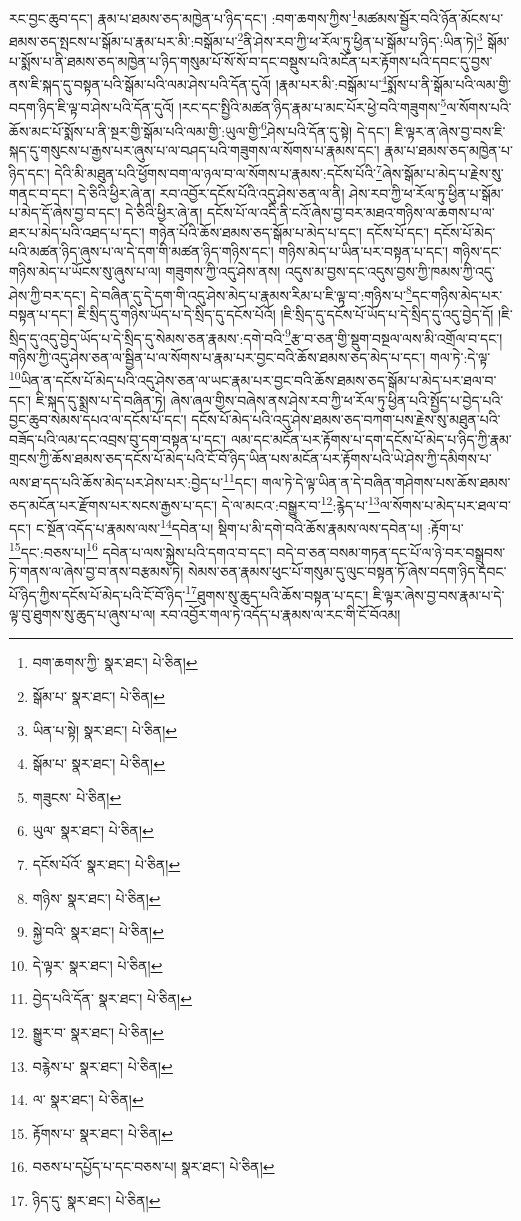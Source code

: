 རང་བྱང་ཆུབ་དང་། རྣམ་པ་ཐམས་ཅད་མཁྱེན་པ་ཉིད་དང་། :བག་ཆགས་ཀྱིས་\footnote{བག་ཆགས་ཀྱི་  སྣར་ཐང་།  པེ་ཅིན། }མཚམས་སྦྱོར་བའི་ཉོན་མོངས་པ་ཐམས་ཅད་སྤངས་པ་སྒོམ་པ་རྣམ་པར་མི་:བསྒོམ་པ་\footnote{སྒོམ་པ་  སྣར་ཐང་།  པེ་ཅིན། }ནི་ཤེས་རབ་ཀྱི་ཕ་རོལ་ཏུ་ཕྱིན་པ་སྒོམ་པ་ཉིད་:ཡིན་ཏེ།\footnote{ཡིན་པ་སྟེ།  སྣར་ཐང་།  པེ་ཅིན། } སྒོམ་པ་སྨོས་པ་ནི་ཐམས་ཅད་མཁྱེན་པ་ཉིད་གསུམ་པོ་སོ་སོ་བ་དང་བསྡུས་པའི་མངོན་པར་རྟོགས་པའི་དབང་དུ་བྱས་ནས་ཇི་སྐད་དུ་བསྟན་པའི་སྒོམ་པའི་ལམ་ཤེས་པའི་དོན་དུའོ། །རྣམ་པར་མི་:བསྒོམ་པ་\footnote{སྒོམ་པ་  སྣར་ཐང་།  པེ་ཅིན། }སྨོས་པ་ནི་སྒོམ་པའི་ལམ་གྱི་བདག་ཉིད་ཇི་ལྟ་བ་ཤེས་པའི་དོན་དུའོ། །རང་དང་སྤྱིའི་མཚན་ཉིད་རྣམ་པ་མང་པོར་ཕྱེ་བའི་གཟུགས་\footnote{གཟུངས་  པེ་ཅིན། }ལ་སོགས་པའི་ཆོས་མང་པོ་སྨོས་པ་ནི་སྔར་གྱི་སྒོམ་པའི་ལམ་གྱི་:ཡུལ་གྱི་\footnote{ཡུལ་  སྣར་ཐང་།  པེ་ཅིན། }ཤེས་པའི་དོན་དུ་སྟེ། དེ་དང་། ཇི་ལྟར་ན་ཞེས་བྱ་བས་ཇི་སྐད་དུ་གསུངས་པ་རྒྱས་པར་ཞུས་པ་ལ་བཤད་པའི་གཟུགས་ལ་སོགས་པ་རྣམས་དང་། རྣམ་པ་ཐམས་ཅད་མཁྱེན་པ་ཉིད་དང་། དེའི་མི་མཐུན་པའི་ཕྱོགས་བག་ལ་ཉལ་བ་ལ་སོགས་པ་རྣམས་:དངོས་པོའི་\footnote{དངོས་པོའོ་  སྣར་ཐང་།  པེ་ཅིན། }ཞེས་སྒོམ་པ་མེད་པ་རྗེས་སུ་གནང་བ་དང་། དེ་ཅིའི་ཕྱིར་ཞེ་ན། རབ་འབྱོར་དངོས་པོའི་འདུ་ཤེས་ཅན་ལ་ནི། ཤེས་རབ་ཀྱི་ཕ་རོལ་ཏུ་ཕྱིན་པ་སྒོམ་པ་མེད་དོ་ཞེས་བྱ་བ་དང་། དེ་ཅིའི་ཕྱིར་ཞེ་ན། དངོས་པོ་ལ་འདི་ནི་ངའོ་ཞེས་བྱ་བར་མཐའ་གཉིས་ལ་ཆགས་པ་ལ་ཐར་པ་མེད་པའི་འཐད་པ་དང་། གཉེན་པོའི་ཆོས་ཐམས་ཅད་སྒོམ་པ་མེད་པ་དང་། དངོས་པོ་དང་། དངོས་པོ་མེད་པའི་མཚན་ཉིད་ཞུས་པ་ལ་དེ་དག་གི་མཚན་ཉིད་གཉིས་དང་། གཉིས་མེད་པ་ཡིན་པར་བསྟན་པ་དང་། གཉིས་དང་གཉིས་མེད་པ་ཡོངས་སུ་ཞུས་པ་ལ། གཟུགས་ཀྱི་འདུ་ཤེས་ནས། འདུས་མ་བྱས་དང་འདུས་བྱས་ཀྱི་ཁམས་ཀྱི་འདུ་ཤེས་ཀྱི་བར་དང་། དེ་བཞིན་དུ་དེ་དག་གི་འདུ་ཤེས་མེད་པ་རྣམས་རིམ་པ་ཇི་ལྟ་བ་:གཉིས་པ་\footnote{གཉིས་  སྣར་ཐང་།  པེ་ཅིན། }དང་གཉིས་མེད་པར་བསྟན་པ་དང་། ཇི་སྲིད་དུ་གཉིས་ཡོད་པ་དེ་སྲིད་དུ་དངོས་པོའོ། །ཇི་སྲིད་དུ་དངོས་པོ་ཡོད་པ་དེ་སྲིད་དུ་འདུ་བྱེད་དོ། །ཇི་སྲིད་དུ་འདུ་བྱེད་ཡོད་པ་དེ་སྲིད་དུ་སེམས་ཅན་རྣམས་:དགེ་བའི་\footnote{སྐྱེ་བའི་  སྣར་ཐང་།  པེ་ཅིན། }རྩ་བ་ཅན་གྱི་སྡུག་བསྔལ་ལས་མི་འགྲོལ་བ་དང་། གཉིས་ཀྱི་འདུ་ཤེས་ཅན་ལ་སྦྱིན་པ་ལ་སོགས་པ་རྣམ་པར་བྱང་བའི་ཆོས་ཐམས་ཅད་མེད་པ་དང་། གལ་ཏེ་:དེ་ལྟ་\footnote{དེ་ལྟར་  སྣར་ཐང་།  པེ་ཅིན། }ཡིན་ན་དངོས་པོ་མེད་པའི་འདུ་ཤེས་ཅན་ལ་ཡང་རྣམ་པར་བྱང་བའི་ཆོས་ཐམས་ཅད་སྒོམ་པ་མེད་པར་ཐལ་བ་དང་། ཇི་སྐད་དུ་སྨྲས་པ་དེ་བཞིན་ཏེ། ཞེས་ཞལ་གྱིས་བཞེས་ནས་ཤེས་རབ་ཀྱི་ཕ་རོལ་ཏུ་ཕྱིན་པའི་སྤྱོད་པ་བྱེད་པའི་བྱང་ཆུབ་སེམས་དཔའ་ལ་དངོས་པོ་དང་། དངོས་པོ་མེད་པའི་འདུ་ཤེས་ཐམས་ཅད་བཀག་པས་རྗེས་སུ་མཐུན་པའི་བཟོད་པའི་ལམ་དང་འབྲས་བུ་དག་བསྟན་པ་དང་། ལམ་དང་མངོན་པར་རྟོགས་པ་དག་དངོས་པོ་མེད་པ་ཉིད་ཀྱི་རྣམ་གྲངས་ཀྱི་ཆོས་ཐམས་ཅད་དངོས་པོ་མེད་པའི་ངོ་བོ་ཉིད་ཡིན་པས་མངོན་པར་རྟོགས་པའི་ཡེ་ཤེས་ཀྱི་དམིགས་པ་ལས་ཐ་དད་པའི་ཆོས་མེད་པར་ཤེས་པར་:བྱེད་པ་\footnote{བྱེད་པའི་དོན་  སྣར་ཐང་།  པེ་ཅིན། }དང་། གལ་ཏེ་དེ་ལྟ་ཡིན་ན་དེ་བཞིན་གཤེགས་པས་ཆོས་ཐམས་ཅད་མངོན་པར་རྫོགས་པར་སངས་རྒྱས་པ་དང་། དེ་ལ་མངའ་:བསྒྱུར་བ་\footnote{སྒྱུར་བ་  སྣར་ཐང་།  པེ་ཅིན། }:རྙེད་པ་\footnote{བརྙེས་པ་  སྣར་ཐང་།  པེ་ཅིན། }ལ་སོགས་པ་མེད་པར་ཐལ་བ་དང་། ང་སྔོན་འདོད་པ་རྣམས་ལས་\footnote{ལ་  སྣར་ཐང་།  པེ་ཅིན། }དབེན་པ། སྡིག་པ་མི་དགེ་བའི་ཆོས་རྣམས་ལས་དབེན་པ། :རྟོག་པ་\footnote{རྟོགས་པ་  སྣར་ཐང་།  པེ་ཅིན། }དང་:བཅས་པ།\footnote{བཅས་པ་དཔྱོད་པ་དང་བཅས་པ།  སྣར་ཐང་།  པེ་ཅིན། } དབེན་པ་ལས་སྐྱེས་པའི་དགའ་བ་དང་། བདེ་བ་ཅན་བསམ་གཏན་དང་པོ་ལ་ཉེ་བར་བསྒྲུབས་ཏེ་གནས་ལ་ཞེས་བྱ་བ་ནས་བརྩམས་ཏེ། སེམས་ཅན་རྣམས་ཕུང་པོ་གསུམ་དུ་ལུང་བསྟན་ཏོ་ཞེས་བདག་ཉིད་དབང་པོ་ཉིད་ཀྱིས་དངོས་པོ་མེད་པའི་ངོ་བོ་ཉིད་\footnote{ཉིད་དུ་  སྣར་ཐང་།  པེ་ཅིན། }ཐུགས་སུ་ཆུད་པའི་ཆོས་བསྟན་པ་དང་། ཇི་ལྟར་ཞེས་བྱ་བས་རྣམ་པ་དེ་ལྟ་བུ་ཐུགས་སུ་ཆུད་པ་ཞུས་པ་ལ། རབ་འབྱོར་གལ་ཏེ་འདོད་པ་རྣམས་ལ་རང་གི་ངོ་བོའམ། 